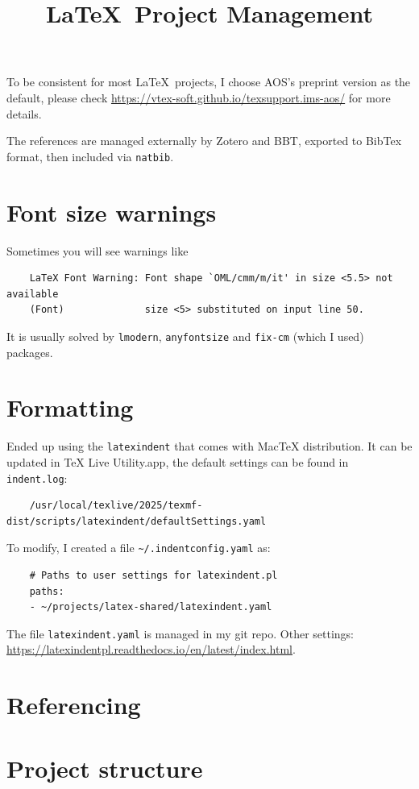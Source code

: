\documentclass[aos,preprint]{imsart}
\begin{document}
\title{\LaTeX\ Project Management}

To be consistent for most \LaTeX\ projects,
I choose AOS's preprint version as the default, please check
\url{https://vtex-soft.github.io/texsupport.ims-aos/} for more details.

The references are managed externally by Zotero and BBT,
exported to BibTex format, then included via \verb|natbib|.

\section{Font size warnings}

Sometimes you will see warnings like
\begin{Verbatim}
	LaTeX Font Warning: Font shape `OML/cmm/m/it' in size <5.5> not available
	(Font)              size <5> substituted on input line 50.
\end{Verbatim}

It is usually solved by \verb|lmodern|, \verb|anyfontsize| and \verb|fix-cm| (which I used) packages.

\section{Formatting}

Ended up using the \verb|latexindent| that comes with MacTeX distribution.
It can be updated in TeX Live Utility.app, the default settings can be found in \verb|indent.log|:
\begin{Verbatim}
	/usr/local/texlive/2025/texmf-dist/scripts/latexindent/defaultSettings.yaml
\end{Verbatim}

To modify, I created a file \verb|~/.indentconfig.yaml| as:
\begin{Verbatim}
	# Paths to user settings for latexindent.pl
	paths:
	- ~/projects/latex-shared/latexindent.yaml
\end{Verbatim}

The file \verb|latexindent.yaml| is managed in my git repo.
Other settings: \url{https://latexindentpl.readthedocs.io/en/latest/index.html}.

\section{Referencing}


\section{Project structure}
\end{document}
